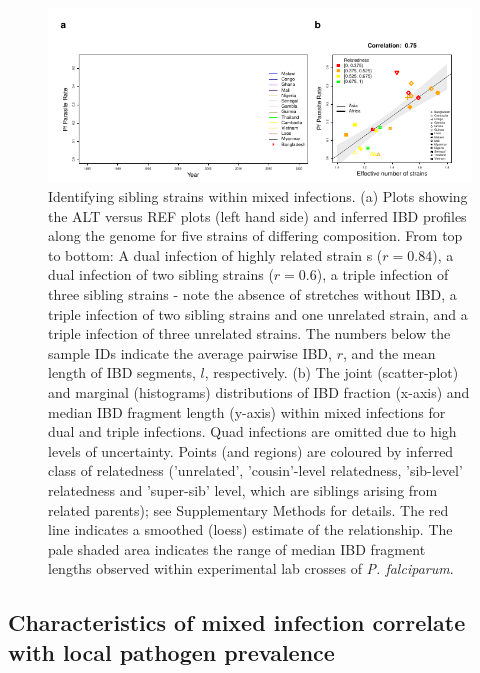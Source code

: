 \documentclass[9pt,lineno]{elife}
\begin{document}
\begin{figure}[h]
  \begin{center}
  \includegraphics[width=\textwidth]{Fig4.pdf}
   \caption{Identifying sibling strains within mixed infections.  (a) Plots showing the ALT versus REF plots (left hand side) and inferred IBD profiles along the genome for five strains of differing composition.  From top to bottom: A dual infection of highly related strain s ($r=0.84$), a dual infection of two sibling strains ($r=0.6$), a triple infection of three sibling strains - note the absence of stretches without IBD, a triple infection of two sibling strains and one unrelated strain, and a triple infection of three unrelated strains.  The numbers below the sample IDs indicate the average pairwise IBD, $r$, and the mean length of IBD segments, $l$, respectively.  (b) The joint (scatter-plot) and marginal (histograms) distributions of IBD fraction (x-axis) and median IBD fragment length (y-axis) within mixed infections for dual and triple infections.  Quad infections are omitted due to high levels of uncertainty. Points (and regions) are coloured by inferred class of relatedness ('unrelated', 'cousin'-level relatedness, 'sib-level' relatedness and 'super-sib' level, which are siblings arising from related parents); see Supplementary Methods for details.  The red line indicates a smoothed (loess) estimate of the relationship. The pale shaded area indicates the range of median IBD fragment lengths observed within experimental lab crosses of {\it P. falciparum}.}\label{fig:strainIBD}
   \end{center}
\end{figure}



\subsection{Characteristics of mixed infection correlate with local pathogen prevalence}
\end{document}
